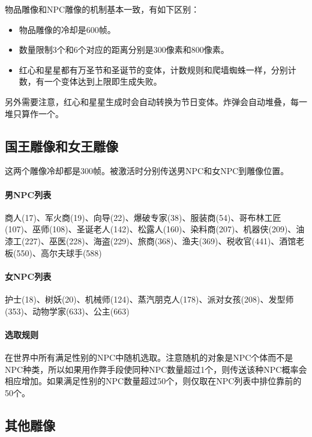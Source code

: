 物品雕像和NPC雕像的机制基本一致，有如下区别：
\begin{itemize}
  \item 物品雕像的冷却是600帧。
  \item 数量限制3个和6个对应的距离分别是300像素和800像素。
  \item 红心和星星都有万圣节和圣诞节的变体，计数规则和爬墙蜘蛛一样，分别计数，有一个变体达到上限即生成失败。
\end{itemize}
另外需要注意，红心和星星生成时会自动转换为节日变体。炸弹会自动堆叠，每一堆只算作一个。

\subsection{国王雕像和女王雕像}
\begin{center}
  \quad
\end{center}

这两个雕像冷却都是300帧。被激活时分别传送男NPC和女NPC到雕像位置。
\paragraph{男NPC列表}商人(17)、军火商(19)、向导(22)、爆破专家(38)、服装商(54)、哥布林工匠(107)、巫师(108)、圣诞老人(142)、松露人(160)、染料商(207)、机器侠(209)、油漆工(227)、巫医(228)、海盗(229)、旅商(368)、渔夫(369)、税收官(441)、酒馆老板(550)、高尔夫球手(588)
\paragraph{女NPC列表}护士(18)、树妖(20)、机械师(124)、蒸汽朋克人(178)、派对女孩(208)、发型师(353)、动物学家(633)、公主(663)
\paragraph{选取规则}在世界中所有满足性别的NPC中随机选取。注意随机的对象是NPC个体而不是NPC种类，所以如果用作弊手段使同种NPC数量超过1个，则传送该种NPC概率会相应增加。如果满足性别的NPC数量超过50个，则仅取在NPC列表中排位靠前的50个。

\subsection{其他雕像}
\begin{center}
  \quad
\end{center}

